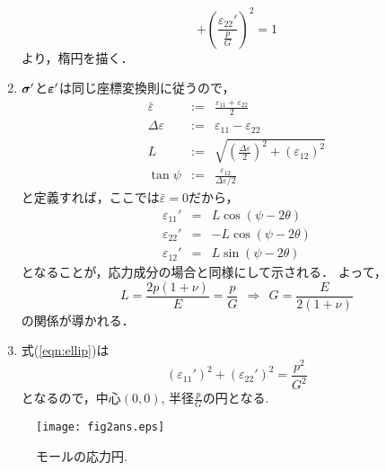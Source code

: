 \documentclass[10pt,a4j]{jarticle}
\begin{document}
\begin{enumerate}
\begin{equation}
		+ 
		\left(\frac{\varepsilon_{22}'}{\frac{p}{G}}\right)^2  = 1
		\label{eqn:ellip}
	\end{equation}
	より，楕円を描く．
\item
	$\mbox{\boldmath $\sigma$}'$と$\mbox{\boldmath $\varepsilon$}'$は同じ座標変換則に従うので，
	\begin{eqnarray}
		\bar \varepsilon &:=& \frac{\varepsilon_{11}+\varepsilon_{22}}{2} \\ 
		\Delta \varepsilon &:=& \varepsilon_{11}-\varepsilon_{22} \\
		L &:=&\sqrt{\left( \frac{\Delta \varepsilon}{2}\right)^2 + \left( \varepsilon_{12}\right)^2} \\
		\tan \psi &:=&\frac{\varepsilon_{12}}{\Delta \varepsilon/2}
	\end{eqnarray}
	と定義すれば，ここでは$\bar \varepsilon=0$だから，
	\begin{eqnarray}
		\varepsilon_{11}' &= &  L \cos (\psi-2\theta) \\
		\varepsilon_{22}' &= &  -L \cos (\psi-2\theta) \\
		\varepsilon_{12}' &= &  L \sin (\psi-2\theta) 
	\end{eqnarray}
	となることが，応力成分の場合と同様にして示される．
	よって，
	\[
		L=\frac{2p(1+\nu)}{E}=\frac{p}{G}
		\ \ 
		\Rightarrow
		\ \ 
		G=\frac{E}{2(1+\nu)}
	\]
	の関係が導かれる．
\item
	式(\ref{eqn:ellip})は
	\begin{equation}
		\left(\varepsilon_{11}'\right)^2 + \left(\varepsilon_{22}'\right)^2  = \frac{p^2}{G^2}
	\end{equation}
	となるので，中心$(0,0)$, 半径$\frac{p}{G}$の円となる.
\end{enumerate}
\begin{figure}
	\begin{center}
	\texttt{[image: fig2ans.eps]} 
	\end{center}
	\caption{モールの応力円.} 
	\label{fig:fig2}
\end{figure}
\end{document}
